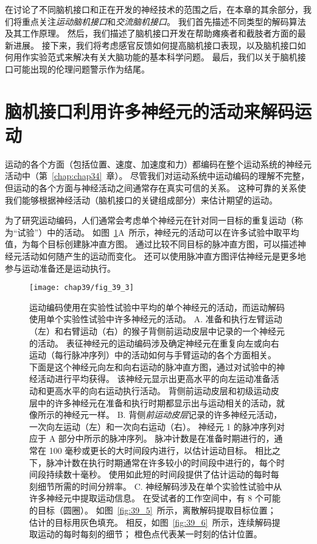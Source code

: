在讨论了不同脑机接口和正在开发的神经技术的范围之后，在本章的其余部分，我们将重点关注\textit{运动脑机接口}和\textit{交流脑机接口}。 
我们首先描述不同类型的解码算法及其工作原理。
然后，我们描述了脑机接口开发在帮助瘫痪者和截肢者方面的最新进展。 
接下来，我们将考虑感官反馈如何提高脑机接口表现，以及脑机接口如何用作实验范式来解决有关大脑功能的基本科学问题。
最后，我们以关于脑机接口可能出现的伦理问题警示作为结尾。



\section{脑机接口利用许多神经元的活动来解码运动}

运动的各个方面（包括位置、速度、加速度和力）都编码在整个运动系统的神经元活动中（第~\ref{chap:chap34}~章）。
尽管我们对运动系统中运动编码的理解不完整，但运动的各个方面与神经活动之间通常存在真实可信的关系。
这种可靠的关系使我们能够根据神经活动（脑机接口的关键组成部分）来估计期望的运动。


为了研究运动编码，人们通常会考虑单个神经元在针对同一目标的重复运动（称为“试验”）中的活动。
如图~\ref{fig:39_3}A~所示，神经元的活动可以在许多试验中取平均值，为每个目标创建脉冲直方图。
通过比较不同目标的脉冲直方图，可以描述神经元活动如何随产生的运动而变化。
还可以使用脉冲直方图评估神经元是更多地参与运动准备还是运动执行。


\begin{figure}[htbp]
	\centering
	\texttt{[image: chap39/fig\_39\_3]}
	\caption{运动编码使用在实验性试验中平均的单个神经元的活动，而运动解码使用单个实验性试验中许多神经元的活动。
		A. 准备和执行左臂运动（左）和右臂运动（右）的猴子背侧前运动皮层中记录的一个神经元的活动。
		表征神经元的运动编码涉及确定神经元在重复向左或向右运动（每行脉冲序列）中的活动如何与手臂运动的各个方面相关。
		下面是这个神经元向左和向右运动的脉冲直方图，通过对试验中的神经活动进行平均获得。
		该神经元显示出更高水平的向左运动准备活动和更高水平的向右运动执行活动。
		背侧前运动皮层和初级运动皮层中的许多神经元在准备和执行时期都显示出与运动相关的活动，就像所示的神经元一样。
		B. 背侧\textit{前运动皮层}记录的许多神经元活动，一次向左运动（左）和一次向右运动（右）。
		神经元 1 的脉冲序列对应于 A 部分中所示的脉冲序列。
		脉冲计数是在准备时期进行的，通常在 100 毫秒或更长的大时间段内进行，以估计运动目标。
		相比之下，脉冲计数在执行时期通常在许多较小的时间段中进行的，每个时间段持续数十毫秒。
		使用如此短的时间段提供了估计运动的每时每刻细节所需的时间分辨率。
		C. 神经解码涉及在单个实验性试验中从许多神经元中提取运动信息。
		在受试者的工作空间中，有 8 个可能的目标（圆圈）。
		如图~\ref{fig:39_5}~所示，离散解码提取目标位置；
		估计的目标用灰色填充。
		相反，如图~\ref{fig:39_6}~所示，连续解码提取运动的每时每刻的细节；
		橙色点代表某一时刻的估计位置。}
	\label{fig:39_3}
\end{figure}



